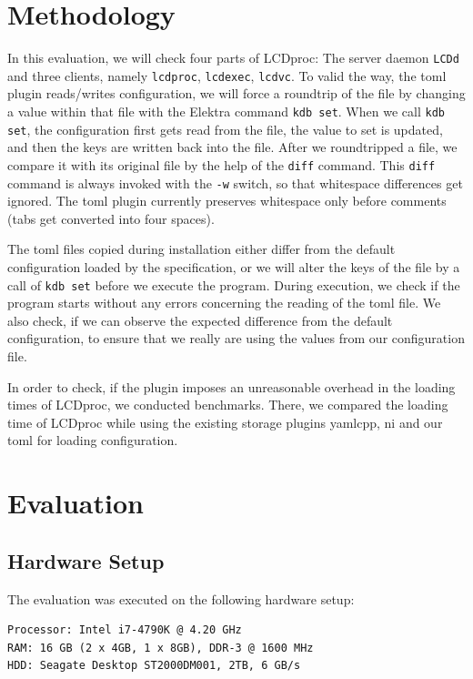 \documentclass[draft,final]{vutinfth} %
\begin{document}
\chapter{Methodology}
In this evaluation, we will check four parts of LCDproc: The server daemon \texttt{LCDd} and three clients, namely \texttt{lcdproc}, \texttt{lcdexec}, \texttt{lcdvc}.
To valid the way, the \acrshort{toml} plugin reads/writes configuration, we will force a roundtrip of the file by changing a value within that file with the Elektra command \texttt{kdb set}.
When we call \texttt{kdb set}, the configuration first gets read from the file, the value to set is updated, and then the keys are written back into the file.
After we roundtripped a file, we compare it with its original file by the help of the \texttt{diff} command.
This \texttt{diff} command is always invoked with the \texttt{-w} switch, so that whitespace differences get ignored.
The \acrshort{toml} plugin currently preserves whitespace only before comments (tabs get converted into four spaces).

The \acrshort{toml} files copied during installation either differ from the default configuration loaded by the specification, or we will alter the keys of the file by a call of \texttt{kdb set} before we execute the program.
During execution, we check if the program starts without any errors concerning the reading of the \acrshort{toml} file.
We also check, if we can observe the expected difference from the default configuration, to ensure that we really are using the values from our configuration file.

In order to check, if the plugin imposes an unreasonable overhead in the loading times of LCDproc, we conducted benchmarks.
There, we compared the loading time of LCDproc while using the existing storage plugins yamlcpp, ni and our \acrshort{toml} for loading configuration.


\chapter{Evaluation}

\section{Hardware Setup}
The evaluation was executed on the following hardware setup:
\begin{Verbatim}[frame=single]
Processor: Intel i7-4790K @ 4.20 GHz
RAM: 16 GB (2 x 4GB, 1 x 8GB), DDR-3 @ 1600 MHz 
HDD: Seagate Desktop ST2000DM001, 2TB, 6 GB/s
\end{Verbatim}
\end{document}
